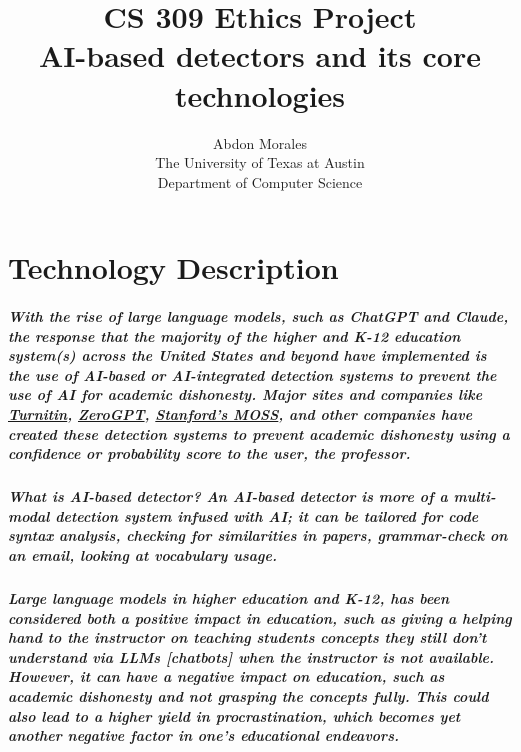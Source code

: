 \documentclass[12pt,letterpaper,final]{report}
\author{Abdon Morales\\The University of Texas at Austin\\Department of Computer Science}
\title{CS 309 Ethics Project\\AI-based detectors and its core technologies}
\begin{document}
\maketitle
\date
%
%


\chapter{Technology Description}

\paragraph{
With the rise of large language models, such as ChatGPT and Claude, the response that the majority of the higher and K-12 education system(s) across the United States and beyond have implemented is the use of AI-based or AI-integrated detection systems to prevent the use of AI for academic dishonesty. Major sites and companies like \href{https://www.turnitin.com/solutions/topics/ai-writing/}{Turnitin}, \href{https://www.zerogpt.com/}{ZeroGPT}, \href{https://theory.stanford.edu/~aiken/moss/}{Stanford's MOSS}, and other companies have created these detection systems to prevent academic dishonesty using a confidence or probability score to the user, the professor.
}
\paragraph{
What is AI-based detector? An AI-based detector is more of a multi-modal detection system infused with AI; it can be tailored for code syntax analysis, checking for similarities in papers, grammar-check on an email, looking at vocabulary usage.
}
\paragraph{
Large language models in higher education and K-12, has been considered both a positive impact in education, such as giving a helping hand to the instructor on teaching students concepts they still don't understand via LLMs [chatbots] when the instructor is not available. However, it can have a negative impact on education, such as academic dishonesty and not grasping the concepts fully. This could also lead to a higher yield in procrastination, which becomes yet another negative factor in one's educational endeavors.
}
\end{document}
